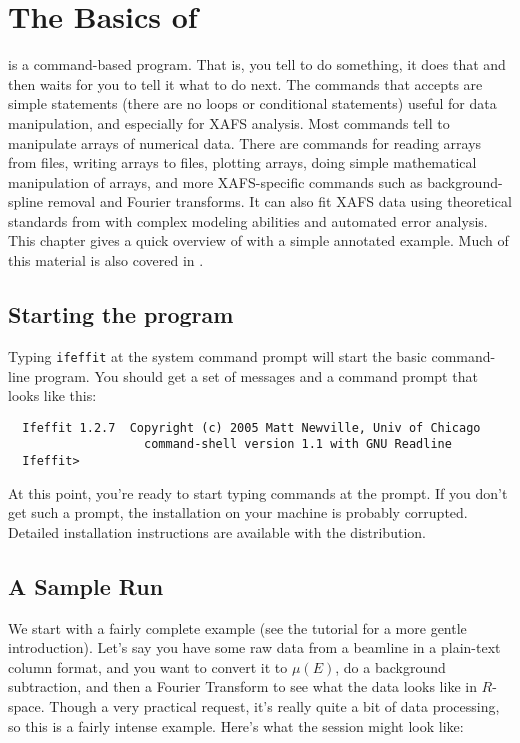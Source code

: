 \section{The Basics of {\ifeffit}} \label{Ch:Basics}

{\ifeffit} is a command-based program. That is, you tell {\ifeffit} to do
something, it does that and then waits for you to tell it what to do next.
The commands that {\ifeffit} accepts are simple statements (there are no
loops or conditional statements) useful for data manipulation, and
especially for XAFS analysis.  Most commands tell {\ifeffit} to manipulate
arrays of numerical data.  There are commands for reading arrays from
files, writing arrays to files, plotting arrays, doing simple mathematical
manipulation of arrays, and more XAFS-specific commands such as
background-spline removal and Fourier transforms.  It can also fit XAFS
data using theoretical standards from {\feff} with complex modeling
abilities and automated error analysis.  This chapter gives a quick
overview of {\ifeffit} with a simple annotated example.  Much of this
material is also covered in {\IFFtut}.

\subsection{Starting the program} \label{Ch:Basics-starting} 

Typing {\tt{ifeffit}} at the system command prompt will start the basic
{\ifeffit} command-line program.  You should get a set of messages and a
command prompt that looks like this:

{\small\begin{verbatim}
  Ifeffit 1.2.7  Copyright (c) 2005 Matt Newville, Univ of Chicago
                   command-shell version 1.1 with GNU Readline
  Ifeffit>
\end{verbatim}}
\noindent
At this point, you're ready to start typing {\ifeffit} commands at the
prompt.  If you don't get such a prompt, the installation on your machine
is probably corrupted. Detailed installation instructions are available
with the {\ifeffit} distribution.

\subsection{A Sample Run} \label{Ch:Basics-sample} 

We start with a fairly complete example (see the tutorial for a more gentle
introduction). Let's say you have some raw data from a beamline in a
plain-text column format, and you want to convert it to $\mu(E)$, do a
background subtraction, and then a Fourier Transform to see what the data
looks like in $R$-space.  Though a very practical request, it's really
quite a bit of data processing, so this is a fairly intense example.
Here's what the session might look like:

